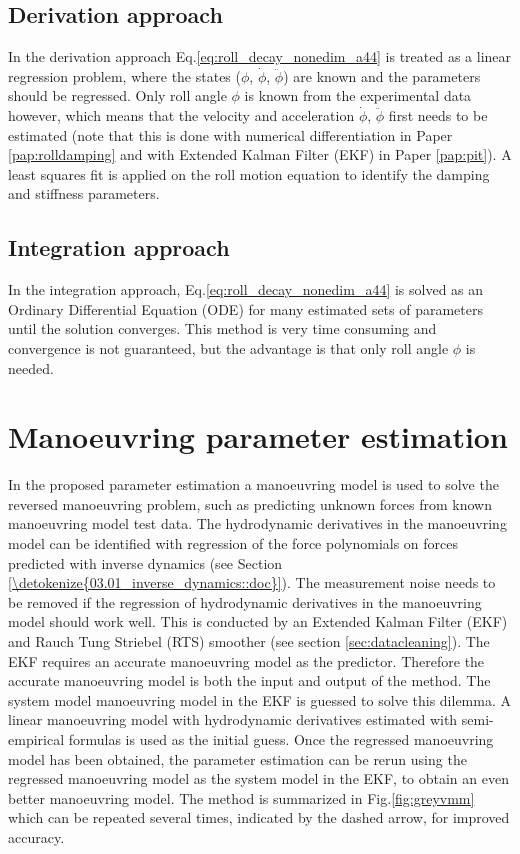 \subsection{Derivation approach}\label{sec:derivation_approach}
In the derivation approach Eq.\ref{eq:roll_decay_nonedim_a44} is treated as a linear regression problem, where the states ($\phi$, $\dot{\phi}$, $\ddot{\phi}$) are known and the parameters should be regressed. Only roll angle $\phi$ is known from the experimental data however, which means that the velocity and acceleration $\dot{\phi}$, $\ddot{\phi}$ first needs to be estimated (note that this is done with numerical differentiation in Paper \ref{pap:rolldamping} and with Extended Kalman Filter (EKF) in Paper \ref{pap:pit}).
A least squares fit is applied on the roll motion equation to identify the damping and stiffness parameters.

\subsection{Integration approach}\label{sec:integration_approach}
In the integration approach, Eq.\ref{eq:roll_decay_nonedim_a44} is solved as an Ordinary Differential Equation (ODE) for many estimated sets of parameters until the solution converges. This method is very time consuming and convergence is not guaranteed, but the advantage is that only roll angle $\phi$ is needed.

\section{Manoeuvring parameter estimation} \label{sec:_VMM}
In the proposed parameter estimation a manoeuvring model is used to solve the reversed manoeuvring problem, such as predicting unknown forces from known manoeuvring model test data. The hydrodynamic derivatives in the manoeuvring model can be identified with regression of the force polynomials on forces predicted with inverse dynamics (see Section \ref{\detokenize{03.01_inverse_dynamics::doc}}).
The measurement noise needs to be removed if the regression of hydrodynamic derivatives in the manoeuvring model should work well. This is conducted by an Extended Kalman Filter (EKF) and Rauch Tung Striebel (RTS) smoother (see section \ref{sec:datacleaning}). The EKF requires an accurate manoeuvring model as the predictor.
Therefore the accurate manoeuvring model is both the input and output of the method. The system model manoeuvring model in the EKF is guessed to solve this dilemma. A linear manoeuvring model with hydrodynamic derivatives estimated with semi-empirical formulas is used as the initial guess. Once the regressed manoeuvring model has been obtained, the parameter estimation can be rerun using the regressed manoeuvring model as the system model in the EKF, to obtain an even better manoeuvring model. The method is summarized in Fig.\ref{fig:greyvmm} which can be repeated several times, indicated by the dashed arrow, for improved accuracy. 

